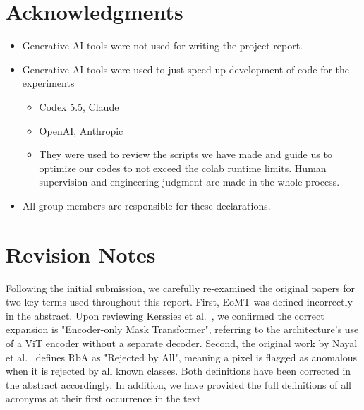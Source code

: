 \documentclass[10pt,twocolumn,letterpaper]{article}
\begin{document}
\section{Acknowledgments}
\begin{itemize}
    \item Generative AI tools were not used for writing the project report.
    \item Generative AI tools were used to just speed up development of code for the experiments
    \begin{itemize}
        \item Codex 5.5, Claude
        \item OpenAI, Anthropic
        \item They were used to review the scripts we have made and guide us to optimize our codes to not exceed the colab runtime limits.
        Human supervision and engineering judgment are made in the whole process.
        
    \end{itemize}
    \item All group members are responsible for these declarations.
\end{itemize}

\section{Revision Notes}
Following the initial submission, we carefully re-examined the original papers for two key terms used throughout this report. First, EoMT was defined incorrectly in the abstract. Upon reviewing Kerssies et al.~\cite{kerssies2025your}, we confirmed the correct expansion is "Encoder-only Mask Transformer", referring to the architecture's use of a ViT encoder without a separate decoder. Second, the original work by Nayal et al.~\cite{nayal2023rba} defines RbA as "Rejected by All", meaning a pixel is flagged as anomalous when it is rejected by all known classes. Both definitions have been corrected in the abstract accordingly. In addition, we have provided the full definitions of all acronyms at their first occurrence in the text.

{\small
  
  
}
\end{document}

